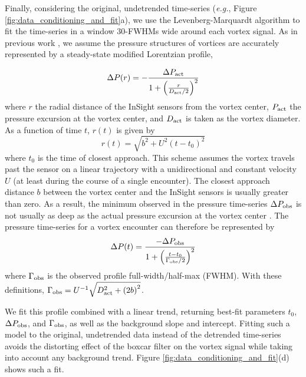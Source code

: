 \documentclass{aastex63}
\begin{document}
Finally, considering the original, undetrended time-series (\emph{e.g.}, Figure \ref{fig:data_conditioning_and_fit}a), we use the Levenberg-Marquardt algorithm \citep[\emph{cf.}][]{Press2007} to fit the time-series in a window 30-FWHMs wide around each vortex signal. As in previous work \citep[\emph{e.g.},][]{2016JGRE..121.1514K}, we assume the pressure structures of vortices are accurately represented by a steady-state modified Lorentzian profile,

\begin{equation}
    \Delta P(r) = -\frac{\Delta P_{\rm act}}{1 + \left( \frac{r}{D_{\rm act}/2} \right)^2}\label{eqn:radial_lorentzian_profile}
\end{equation}
where $r$ the radial distance of the InSight sensors from the vortex center, $P_{\rm act}$ the pressure excursion at the vortex center, and $D_{\rm act}$ is taken as the vortex diameter. As a function of time $t$, $r(t)$ is given by
\begin{equation}
    r(t) = \sqrt{b^2 + U^2 \left( t - t_0 \right)^2}\label{eqn:radial_distance}
\end{equation}
where $t_0$ is the time of closest approach. This scheme assumes the vortex travels past the sensor on a linear trajectory with a unidirectional and constant velocity $U$ (at least during the course of a single encounter). The closest approach distance $b$ between the vortex center and the InSight sensors is usually greater than zero. As a result, the minimum observed in the pressure time-series $\Delta P_{\rm obs}$ is not usually as deep as the actual pressure excursion at the vortex center \citep{2018Icar..299..166J, 2019Icar..317..209K}. The pressure time-series for a vortex encounter can therefore be represented by 
\begin{equation}
    \Delta P(t) = \frac{-\Delta P_{\rm obs}}{1 + \left( \frac{ t - t_0 }{\Gamma_{\rm obs}/2} \right)^2}\label{eqn:Lorentzian_profile}
\end{equation}
where $\Gamma_{\rm obs}$ is the observed profile full-width/half-max (FWHM). With these definitions, $\Gamma_{\rm obs} = U^{-1} \sqrt{D_{\rm act}^2 + \left( 2 b \right)^2}$. 

We fit this profile combined with a linear trend, returning best-fit parameters $t_0$, $\Delta P_{\rm obs}$, and $\Gamma_{\rm obs}$, as well as the background slope and intercept. Fitting such a model to the original, undetrended data instead of the detrended time-series avoids the distorting effect of the boxcar filter on the vortex signal while taking into account any background trend. Figure \ref{fig:data_conditioning_and_fit}(d) shows such a fit.
\end{document}

